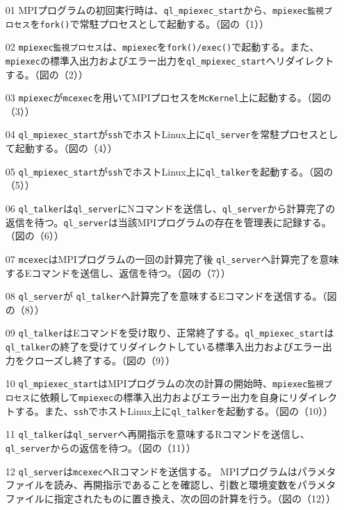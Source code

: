 \documentclass[twoside,11pt,fleqn]{book}
\begin{document}
\begin{itemize}
\item[01] MPIプログラムの初回実行時は、\texttt{ql\_mpiexec\_start}から、\texttt{mpiexec監視プロセス}を\texttt{fork()}で常駐プロセスとして起動する。（図の（1））
\item[02] \texttt{mpiexec監視プロセス}は、\texttt{mpiexec}を\texttt{fork()/exec()}で起動する。また、\texttt{mpiexec}の標準入出力およびエラー出力を\texttt{ql\_mpiexec\_start}へリダイレクトする。（図の（2））
\item[03] \texttt{mpiexec}が\texttt{mcexec}を用いてMPIプロセスを\texttt{McKernel}上に起動する。（図の（3））
\item[04] \texttt{ql\_mpiexec\_start}が\texttt{ssh}でホストLinux上に\texttt{ql\_server}を常駐プロセスとして起動する。（図の（4））
\item[05] \texttt{ql\_mpiexec\_start}が\texttt{ssh}でホストLinux上に\texttt{ql\_talker}を起動する。（図の（5））
\item[06] \texttt{ql\_talker}は\texttt{ql\_server}にNコマンドを送信し、\texttt{ql\_server}から計算完了の返信を待つ。\texttt{ql\_server}は当該MPIプログラムの存在を管理表に記録する。（図の（6））
\item[07] \texttt{mcexec}はMPIプログラムの一回の計算完了後
\texttt{ql\_server}へ計算完了を意味するEコマンドを送信し、返信を待つ。（図の（7））
\item[08] \texttt{ql\_server}が \texttt{ql\_talker}へ計算完了を意味するEコマンドを送信する。（図の（8））
\item[09]  \texttt{ql\_talker}はEコマンドを受け取り、正常終了する。\texttt{ql\_mpiexec\_start}は\texttt{ql\_talker}の終了を受けてリダイレクトしている標準入出力およびエラー出力をクローズし終了する。（図の（9））
\item[10] \texttt{ql\_mpiexec\_start}はMPIプログラムの次の計算の開始時、\texttt{mpiexec監視プロセス}に依頼して\texttt{mpiexec}の標準入出力およびエラー出力を自身にリダイレクトする。また、\texttt{ssh}でホストLinux上に\texttt{ql\_talker}を起動する。（図の（10））
\item[11] \texttt{ql\_talker}は\texttt{ql\_server}へ再開指示を意味するRコマンドを送信し、\texttt{ql\_server}からの返信を待つ。（図の（11））
\item[12] \texttt{ql\_server}は\texttt{mcexec}へRコマンドを送信する。
MPIプログラムはパラメタファイルを読み、再開指示であることを確認し、引数と環境変数をパラメタファイルに指定されたものに置き換え、次の回の計算を行う。（図の（12））

\end{itemize}
\end{document}
